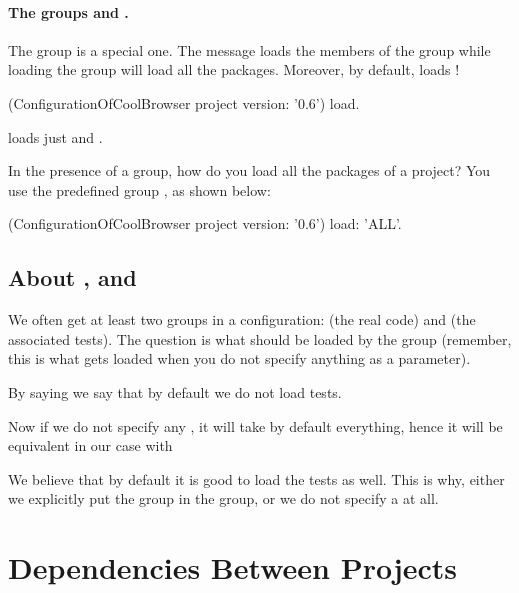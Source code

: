 \documentclass[a4paper,10pt,twoside]{book}
\begin{document}
\paragraph{The groups  and .}
The  group is a special one.  The  message loads the members of the  group while loading the  group will load all the packages. Moreover, by default,  loads !


\begin{code}{}
(ConfigurationOfCoolBrowser project version: '0.6') load.
\end{code}

\noindent
loads just  and .

In the presence of a  group, how do you load all the packages of a project?  You use the predefined   group , as shown below:

\begin{code}{}
(ConfigurationOfCoolBrowser project version: '0.6') load: 'ALL'.
\end{code}

\subsection{About ,  and }

We often get at least two groups in a configuration:  (the real code) and  (the associated tests).  The question is what should be loaded by the  group (remember, this is what gets loaded when you do not specify anything as a parameter).

By saying  we say that by default we do not load tests.

Now if we do not specify any , it will take by default everything, hence it will be equivalent in our case with 

We believe that by default it is good to load the tests as well. This is why, either we explicitly put the  group in the  group, or we do not specify a  at all.



\section{Dependencies Between Projects}
\end{document}
